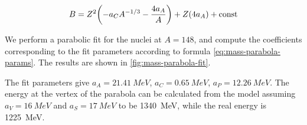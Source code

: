 \documentclass{article}
\begin{document}
\begin{equation} \label{eq:mass-parabola-params}
    B = Z^2 \qty(-a_C A^{-1/3} - \frac{4 a_A}{A}) + Z\qty(4a_A) + \text{const}
\end{equation}

\begin{bluebox}
  We perform a parabolic fit for the nuclei at \(A = 148\), and compute the coefficients corresponding to the fit parameters according to formula \eqref{eq:mass-parabola-params}. The results are shown in \ref{fig:mass-parabola-fit}.

  The fit parameters give \(a_A = \SI{21.41}{MeV}\), \(a_C = \SI{0.65}{MeV}\), \(a_P = \SI{12.26}{MeV}\). The energy at the vertex of the parabola can be calculated from the model assuming \(a_V = \SI{16}{MeV}\) and \(a_S = \SI{17}{MeV}\) to be \SI{1340}{MeV}, while the real energy is  \SI{1225}{MeV}.
\end{bluebox}
\end{document}
